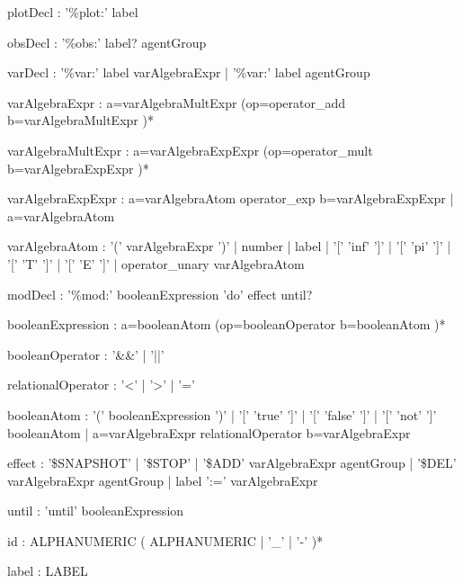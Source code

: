 \begin{bnfsource}




plotDecl :
  '\%plot:' label

obsDecl :
  '\%obs:' label? agentGroup

varDecl :
  '\%var:' label varAlgebraExpr
   | '\%var:' label agentGroup

varAlgebraExpr :
  a=varAlgebraMultExpr (op=operator_add b=varAlgebraMultExpr )*
  
varAlgebraMultExpr :
  a=varAlgebraExpExpr (op=operator_mult b=varAlgebraExpExpr )*
  
varAlgebraExpExpr :
  a=varAlgebraAtom operator_exp b=varAlgebraExpExpr
  | a=varAlgebraAtom
  
varAlgebraAtom :
  '(' varAlgebraExpr ')'
  | number
  | label
  | '[' 'inf' ']'
  | '[' 'pi' ']'
  | '[' 'T' ']'
  | '[' 'E' ']'
  | operator_unary varAlgebraAtom
  
modDecl :
  '\%mod:' booleanExpression 'do' effect until?
  
booleanExpression :
  a=booleanAtom (op=booleanOperator b=booleanAtom )*
  
booleanOperator :
  '&&' | '||'

relationalOperator :
  '<' | '>' | '='

booleanAtom :
  '(' booleanExpression ')'
  | '[' 'true' ']'
  | '[' 'false' ']'
  | '[' 'not' ']' booleanAtom
  | a=varAlgebraExpr relationalOperator b=varAlgebraExpr

effect :
  '\$SNAPSHOT'
  | '\$STOP'
  | '\$ADD' varAlgebraExpr agentGroup
  | '\$DEL' varAlgebraExpr agentGroup
  | label ':=' varAlgebraExpr
  
until :
  'until' booleanExpression
  
  
  
id :
  ALPHANUMERIC ( ALPHANUMERIC | '_' | '-' )* 

label :
  LABEL


\end{bnfsource}
